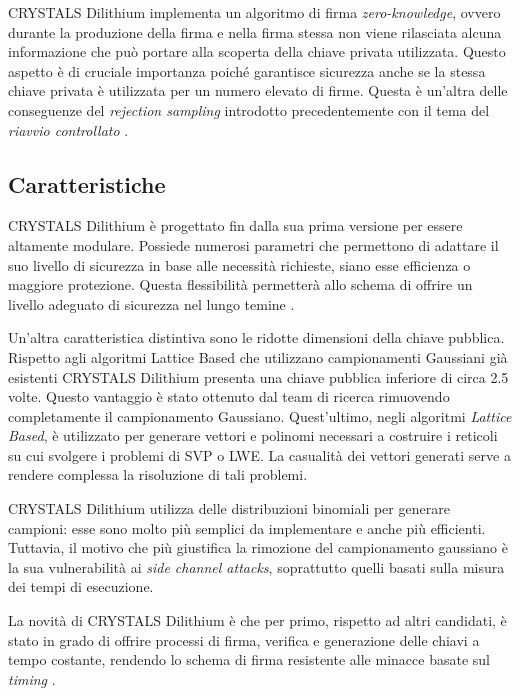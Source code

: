 CRYSTALS Dilithium implementa un algoritmo di firma \textit{zero-knowledge}, ovvero durante la produzione della firma e nella firma stessa non viene rilasciata alcuna informazione che può portare alla scoperta della chiave privata utilizzata. Questo aspetto è di cruciale importanza poiché garantisce sicurezza anche se la stessa chiave privata è utilizzata per un numero elevato di firme. Questa è un'altra delle conseguenze del \textit{rejection sampling} introdotto precedentemente con il tema del \textit{riavvio controllato} \cite{crystalsdilithium-submissionpackage-one}.

\subsection{Caratteristiche}

CRYSTALS Dilithium è progettato fin dalla sua prima versione per essere altamente modulare. Possiede numerosi parametri che permettono di adattare il suo livello di sicurezza in base alle necessità richieste, siano esse efficienza o maggiore protezione. Questa flessibilità permetterà allo schema di offrire un livello adeguato di sicurezza nel lungo temine \cite{crystalsdilithium-submissionpackage-three}.

Un'altra caratteristica distintiva sono le ridotte dimensioni della chiave pubblica. Rispetto agli algoritmi Lattice Based che utilizzano campionamenti Gaussiani già esistenti CRYSTALS Dilithium presenta una chiave pubblica inferiore di circa 2.5 volte. Questo vantaggio è stato ottenuto dal team di ricerca rimuovendo completamente il campionamento Gaussiano. Quest'ultimo, negli algoritmi \textit{Lattice Based}, è utilizzato per generare vettori e polinomi necessari a costruire i reticoli su cui svolgere i problemi di SVP o LWE. La casualità dei vettori generati serve a rendere complessa la risoluzione di tali problemi.

CRYSTALS Dilithium utilizza delle distribuzioni binomiali per generare campioni: esse sono molto più semplici da implementare e anche più efficienti. Tuttavia, il motivo che più giustifica la rimozione del campionamento gaussiano è la sua vulnerabilità ai \textit{side channel attacks}, soprattutto quelli basati sulla misura dei tempi di esecuzione.

La novità di CRYSTALS Dilithium è che per primo, rispetto ad altri candidati, è stato in grado di offrire processi di firma, verifica e generazione delle chiavi a tempo costante, rendendo lo schema di firma resistente alle minacce basate sul \textit{timing} \cite{crystalsdilithium-submissionpackage-three}.

